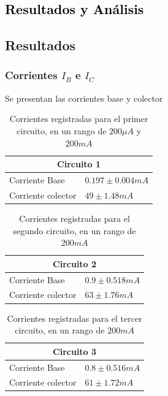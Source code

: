\textcolor{black}{\section{Resultados y Análisis}}
\subsection{Resultados}
\noindent

\subsubsection{Corrientes $I_{B}$ e $I_{C}$}
Se presentan las corrientes base y colector 
\begin{table}[H]
\centering
\caption{Corrientes registradas para el primer circuito, en un rango de $200 \mu A$ y $200 mA$ }
\label{Corrientes1}
\begin{tabular}{|ll|}
\hline
\multicolumn{2}{|c|}{Circuito 1}                                   \\ \hline
\multicolumn{1}{|l|}{Corriente Base}     & $0.197 \pm 0.004 mA$ \\ \hline
\multicolumn{1}{|l|}{Corriente colector} & $49 \pm 1.48 mA$        \\ \hline
\end{tabular}
\end{table}

\begin{table}[H]
\centering
\caption{Corrientes registradas para el segundo circuito, en un rango de $200 mA$}
\label{Corrientes2}
\begin{tabular}{|ll|}
\hline
\multicolumn{2}{|c|}{Circuito 2}                              \\ \hline
\multicolumn{1}{|l|}{Corriente Base}     & $0.9 \pm 0.518 mA$ \\ \hline
\multicolumn{1}{|l|}{Corriente colector} & $63 \pm 1.76 mA$   \\ \hline
\end{tabular}
\end{table}

\begin{table}[H]
\centering
\caption{Corrientes registradas para el tercer circuito, en un rango de $200 mA$}
\label{Corrientes3}
\begin{tabular}{|ll|}
\hline
\multicolumn{2}{|c|}{Circuito 3}                              \\ \hline
\multicolumn{1}{|l|}{Corriente Base}     & $0.8 \pm 0.516 mA$ \\ \hline
\multicolumn{1}{|l|}{Corriente colector} & $61 \pm 1.72 mA$   \\ \hline
\end{tabular}
\end{table}

